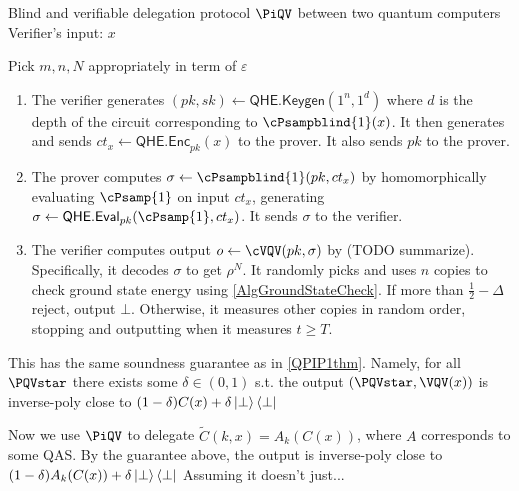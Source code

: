 \begin{protocol}{Blind and verifiable delegation protocol $\PiQV$ between two quantum computers}
	Verifier's input: $x$

	Pick $m, n, N$ appropriately in term of $\varepsilon$
	\begin{enumerate}
		\item The verifier generates $(pk, sk)\leftarrow\mathsf{QHE.Keygen}(1^n, 1^d)$ where $d$ is the depth of the circuit corresponding to $\cPsampblind{1}(x)$.
			It then generates and sends $ct_x\leftarrow\mathsf{QHE.Enc}_{pk}(x)$ to the prover.
			It also sends $pk$ to the prover.
		\item The prover computes $\sigma\leftarrow\cPsampblind{1}(pk, ct_x)$ by homomorphically evaluating $\cPsamp{1}$ on input $ct_x$, generating $\sigma\leftarrow\QEval_{pk}(\cPsamp{1}, ct_x)$.
			It sends $\sigma$ to the verifier.
		\item The verifier computes output $o\leftarrow\cVQV(pk, \sigma)$ by (TODO summarize).
			Specifically, it decodes $\sigma$ to get $\rho^N$.
			It randomly picks and uses $n$ copies to check ground state energy using \cref{AlgGroundStateCheck}. If more than $\frac{1}{2}-\Delta$  reject, output $\bot$.
			Otherwise, it measures other copies in random order, stopping and outputting  when it measures $t\geq T$.

	\end{enumerate}
\end{protocol}

This has the same soundness guarantee as in \cref{QPIP1thm}.
Namely, for all $\PQVstar$ there exists some $\delta\in(0, 1)$ s.t. the output $(\PQVstar, \VQV(x))$ is inverse-poly close to $(1-\delta)C(x) + \delta\ket{\bot}\bra{\bot}$

Now we use $\PiQV$ to delegate $\tilde{C}(k, x)=A_k(C(x))$, where $A$ corresponds to some QAS.
By the guarantee above, the output is inverse-poly close to $(1-\delta)A_k(C(x)) + \delta\ket{\bot}\bra{\bot}$
Assuming it doesn't just...

